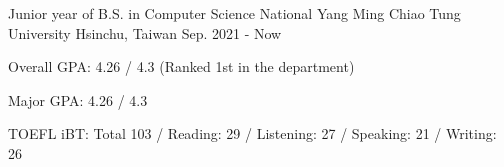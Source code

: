 

\begin{cventries}

  \cventry
    {Junior year of B.S. in Computer Science} %
    {National Yang Ming Chiao Tung University} %
    {Hsinchu, Taiwan} %
    {Sep. 2021 - Now} %
    {
      \begin{cvitems} %
        \item {Overall GPA: 4.26 / 4.3 (Ranked 1st in the department)}
        \item {Major GPA: 4.26 / 4.3}
        \item {TOEFL iBT: Total 103 / Reading: 29 / Listening: 27 / Speaking: 21 / Writing: 26}
      \end{cvitems}
    }

\end{cventries}


    
    
    

